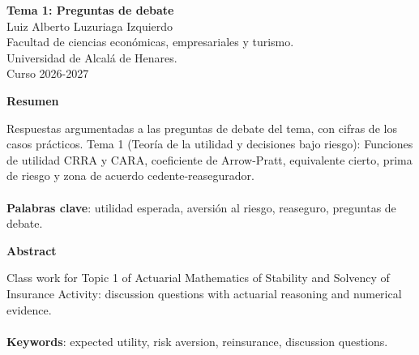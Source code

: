 \documentclass[a4paper,12pt]{article}
\begin{document}
\begin{titlepage}
    \centering
    \vspace*{0.1cm}
    \huge\textbf{Tema 1: Preguntas de debate}\\
    \vspace{1cm}
    \small{Luiz Alberto Luzuriaga Izquierdo}\\
    \vspace{0.1cm}
    Facultad de ciencias económicas, empresariales y turismo. \\
    \vspace{0.1cm}
    Universidad de Alcalá de Henares. \\
    \vspace{0.1cm}
    Curso 2026-2027\\
    \vspace{0.5cm}

{\bfseries Resumen}

\vspace{0.1cm}
\noindent
\begin{justify}
Respuestas argumentadas a las preguntas de debate del tema, con cifras de los casos prácticos. Tema 1 (Teoría de la utilidad y decisiones bajo riesgo): Funciones de utilidad CRRA y CARA, coeficiente de Arrow-Pratt, equivalente cierto, prima de riesgo y zona de acuerdo cedente-reasegurador.\\\\
\vspace{0.1cm}
\noindent
\textbf{Palabras clave}: utilidad esperada, aversión al riesgo, reaseguro, preguntas de debate.
\end{justify}
\begin{center}
    {\bfseries Abstract}
\end{center}
\vspace{0.1cm}
\noindent
\begin{justify}
Class work for Topic 1 of Actuarial Mathematics of Stability and Solvency of Insurance Activity: discussion questions with actuarial reasoning and numerical evidence.\\\\
\vspace{0.1cm}
\noindent
\textbf{Keywords}: expected utility, risk aversion, reinsurance, discussion questions.
\end{justify}

\end{titlepage}

\newpage{}
\renewcommand{\contentsname}{Índice}
\tableofcontents
\end{document}
